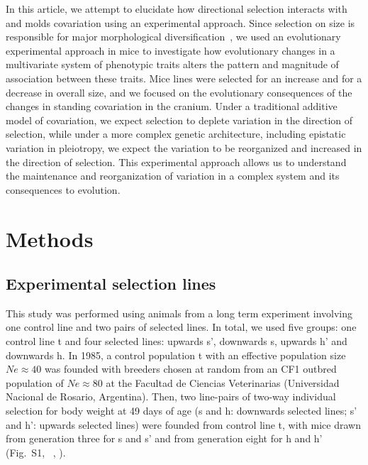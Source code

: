 \begin{refsection}
In this article, we attempt to elucidate how directional selection
interacts with and molds covariation using an experimental approach.
Since selection on size is responsible for major morphological
diversification~\parencite{Baker2015-ti}, we used an evolutionary experimental
approach in mice to investigate how evolutionary changes in a
multivariate system of phenotypic traits alters the pattern and
magnitude of association between these traits. Mice lines were selected
for an increase and for a decrease in overall size, and we focused on
the evolutionary consequences of the changes in standing covariation in
the cranium. Under a traditional additive model of covariation, we
expect selection to deplete variation in the direction of selection,
while under a more complex genetic architecture, including epistatic
variation in pleiotropy, we expect the variation to be reorganized and
increased in the direction of selection. This experimental approach
allows us to understand the maintenance and reorganization of variation
in a complex system and its consequences to evolution.

\section{Methods}

\subsection{Experimental selection lines}

This study was performed using animals from a long term experiment
involving one control line and two pairs of selected lines. In total, we
used five groups: one control line t and four selected lines: upwards
s', downwards s, upwards h' and downwards h. In 1985, a control
population t with an effective population size \(Ne \approx 40\) was
founded with breeders chosen at random from an CF1 outbred population of
\(Ne \approx 80\) at the Facultad de Ciencias Veterinarias (Universidad
Nacional de Rosario, Argentina). Then, two line-pairs of two-way
individual selection for body weight at 49 days of age (s and h:
downwards selected lines; s' and h': upwards selected lines) were
founded from control line t, with mice drawn from generation three for s
and s' and from generation eight for h and h' (Fig.~S1, ~\textcite{Oyarzabal2011-uk},
\textcite{Renny2014-on}).


\end{refsection}
